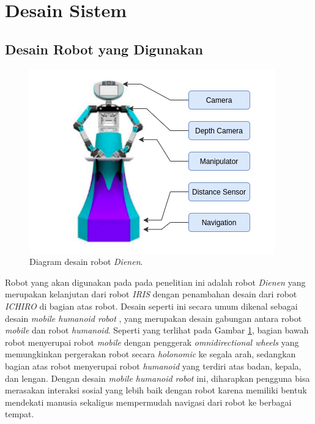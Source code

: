 \section{Desain Sistem}
\label{sec:desainsistem}

\subsection{Desain Robot yang Digunakan}

\begin{figure} [ht]
  \centering
  \includegraphics[scale=0.6]{gambar/desainrobot.png}
  \caption{Diagram desain robot \emph{Dienen}.}
  \label{fig:desainrobot}
\end{figure}

Robot yang akan digunakan pada pada penelitian ini adalah robot \emph{Dienen} yang merupakan kelanjutan dari robot \emph{IRIS} \citep{dikairono2020}\citep{zanuar2019} dengan penambahan desain dari robot \emph{ICHIRO} \citep{muhtadin2019} di bagian atas robot.
Desain seperti ini secara umum dikenal sebagai desain \emph{mobile humanoid robot} \citep{mohamed2012}, yang merupakan desain gabungan antara robot \emph{mobile} dan robot \emph{humanoid}.
Seperti yang terlihat pada Gambar \ref{fig:desainrobot}, bagian bawah robot menyerupai robot \emph{mobile} dengan penggerak \emph{omnidirectional wheels} yang memungkinkan pergerakan robot secara \emph{holonomic} ke segala arah\citep{oliveira2008}, sedangkan bagian atas robot menyerupai robot \emph{humanoid} yang terdiri atas badan, kepala, dan lengan.
Dengan desain \emph{mobile humanoid robot} ini, diharapkan pengguna bisa merasakan interaksi sosial yang lebih baik dengan robot karena memiliki bentuk mendekati manusia \citep{rossi2018} sekaligus mempermudah navigasi dari robot ke berbagai tempat.

